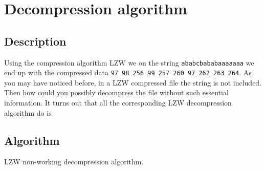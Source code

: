 \begin{refsection}
\begin{algorithm}[H]
\begin{algorithmic}[1]

    \While{\neof}

       
      \Else {}
        \State {}




        \EndIf


      \EndIf


    \EndWhile

    \State {}
    \State {}

  \end{algorithmic}
\end{algorithm}

\section{Decompression algorithm}

\subsection{Description}

Using the compression algorithm LZW we on the string
\texttt{ababcbababaaaaaaa} we end up with the compressed data
\texttt{97 98 256 99 257 260 97 262 263 264}. As you may have noticed
before, in a LZW compressed file the string is not included. Then how
could you possibly decompress the file without such essential
information. It turns out that all the corresponding LZW decompression
algorithm do is

\subsection{Algorithm}


\begin{algorithm}[H]
  \caption{LZW non-working decompression algorithm.}
  \label{alg:lzw-non-working-decompression}
  \begin{algorithmic}[1]
    \State {}
    \While{\neof}


\end{algorithmic}
\end{algorithm}
\end{refsection}
